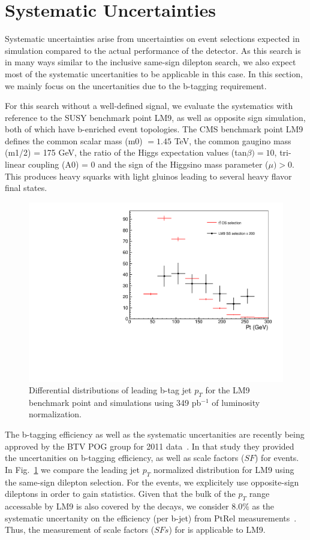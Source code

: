 \section{Systematic Uncertainties}
\label{systematic}
Systematic uncertainties arise from uncertainties on event selections expected in simulation compared to the actual performance of 
the detector. As this search is in many ways similar to the inclusive same-sign dilepton search, we also expect most of the systematic uncertanities
to be applicable in this case. In this section, we mainly focus on the uncertanities due to the b-tagging requirement.

For this search without a well-defined signal, we evaluate the systematics with reference to the SUSY benchmark point LM9, 
as well as opposite sign \ttbar simulation, both of which have b-enriched event topologies. The CMS benchmark point LM9 defines the 
common scalar mass (m0) $ = 1.45$ TeV, the common gaugino mass (m1/2) = 175 GeV, the ratio of the Higgs expectation
values (tan$\beta)  = 10$, tri-linear coupling (A0) = 0 and the  sign of the Higgsino mass parameter ($\mu) > 0$. This produces heavy squarks
with light gluinos leading to several heavy flavor final states.

\begin{figure}[htb]
\begin{center}
\includegraphics[width=0.6\linewidth, height=0.36\linewidth]{figs/bjetleading.pdf}
\caption{ Differential distributions of leading b-tag jet $p_T$ for the LM9 benchmark point and \ttbar simulations using 349 pb$^{-1}$ of luminosity normalization.\label{fig:lm9ttbar}}
\end{center}
\end{figure}
The b-tagging efficiency as well as the systematic uncertanities are recently being approved by the BTV POG group for 2011
data~\cite{BTVPAS2011}. In that study they provided the uncertanities on b-tagging efficiency, as well as scale factors ($SF$) for \ttbar events. In Fig.~\ref{fig:lm9ttbar} 
we compare the leading jet $p_T$ normalized distribution for LM9 using the same-sign dilepton selection. For the \ttbar events, we 
explicitely use opposite-sign dileptons in order to gain statistics. Given that the bulk of the $p_T$ range accessable by LM9 is also covered by the \ttbar decays, 
we consider 8.0\% as the systematic uncertanity on the efficiency (per b-jet) from PtRel measurements~\cite{BTVPAS2011}. Thus, the measurement of scale factors ($SFs$) 
for \ttbar is applicable to LM9.

